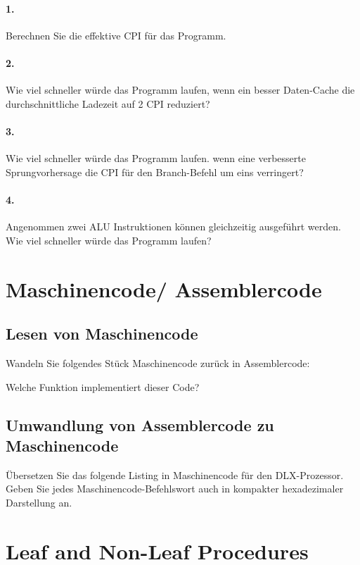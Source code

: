 \documentclass[paper=a4, fontsize=11pt]{scrartcl}
\numberwithin{equation}{section}
\numberwithin{figure}{section}
\numberwithin{table}{section}
\begin{document}
\paragraph{1.}
Berechnen Sie die effektive CPI für das Programm.

\paragraph{2.}
Wie viel schneller würde das Programm laufen, wenn ein besser Daten-Cache die durchschnittliche Ladezeit auf 2 CPI reduziert?

\paragraph{3.}
Wie viel schneller würde das Programm laufen. wenn eine verbesserte Sprungvorhersage die CPI für den Branch-Befehl um eins verringert?

\paragraph{4.}
Angenommen zwei ALU Instruktionen können gleichzeitig ausgeführt werden. Wie viel schneller würde das Programm laufen?

\section{Maschinencode/ Assemblercode}
\subsection{Lesen von Maschinencode}
Wandeln Sie folgendes Stück Maschinencode zurück in Assemblercode:

Welche Funktion implementiert dieser Code?

\subsection{Umwandlung von Assemblercode zu Maschinencode}
Übersetzen Sie das folgende Listing in Maschinencode für den DLX-Prozessor. Geben Sie jedes Maschinencode-Befehlswort auch in kompakter hexadezimaler Darstellung an.

\section{Leaf and Non-Leaf Procedures}
\end{document}
